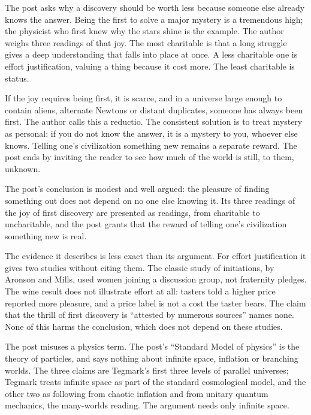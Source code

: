 \begin{afterword}
\summaryhead

The post asks why a discovery should be worth less because someone else already knows the answer. Being the first to solve a major mystery is a tremendous high; the physicist who first knew why the stars shine is the example. The author weighs three readings of that joy. The most charitable is that a long struggle gives a deep understanding that falls into place at once. A less charitable one is effort justification, valuing a thing because it cost more. The least charitable is status.

If the joy requires being first, it is scarce, and in a universe large enough to contain aliens, alternate Newtons or distant duplicates, someone has always been first. The author calls this a reductio. The consistent solution is to treat mystery as personal: if you do not know the answer, it is a mystery to you, whoever else knows. Telling one's civilization something new remains a separate reward. The post ends by inviting the reader to see how much of the world is still, to them, unknown.

\responsehead

The post's conclusion is modest and well argued: the pleasure of finding something out does not depend on no one else knowing it. Its three readings of the joy of first discovery are presented as readings, from charitable to uncharitable, and the post grants that the reward of telling one's civilization something new is real.

The evidence it describes is less exact than its argument. For effort justification it gives two studies without citing them. The classic study of initiations, by Aronson and Mills, used women joining a discussion group, not fraternity pledges. The wine result does not illustrate effort at all: tasters told a higher price reported more pleasure, and a price label is not a cost the taster bears. The claim that the thrill of first discovery is ``attested by numerous sources'' names none. None of this harms the conclusion, which does not depend on these studies.

The post misuses a physics term. The post's ``Standard Model of physics'' is the theory of particles, and says nothing about infinite space, inflation or branching worlds. The three claims are Tegmark's first three levels of parallel universes; Tegmark treats infinite space as part of the standard cosmological model, and the other two as following from chaotic inflation and from unitary quantum mechanics, the many-worlds reading. The argument needs only infinite space.


\end{afterword}
